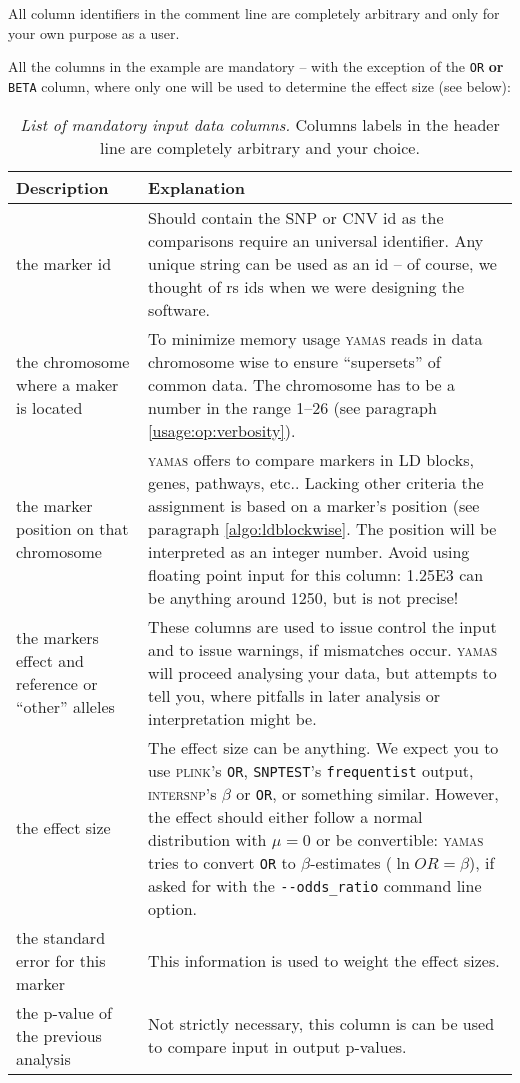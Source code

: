 All column identifiers in the comment line are completely arbitrary and only for your own purpose as a user.

All the columns in the example are mandatory -- with the exception of the \verb+OR+ \textbf{or} \verb+BETA+ column, where only one will be used to determine the effect size (see below):

\begin{table}[H]
 \caption{\emph{List of mandatory input data columns.} Columns labels in the header line are completely arbitrary and your choice.}
 \centering
\begin{tabular}{p{6cm}p{8cm}}
\rowcolor{light-gray}Description & Explanation\\\hline
the marker id  & Should contain the SNP or CNV id as the comparisons require an universal identifier. Any unique string can be used as an id -- of course, we thought of rs ids when we were designing the software.\\
the chromosome where a maker is located & To minimize memory usage \textsc{yamas} reads in data chromosome wise to ensure ``supersets'' of common data. The chromosome has to be a number in the range 1--26 (see paragraph \ref{usage:op:verbosity}).\\
the marker position on that chromosome & \textsc{yamas} offers to compare markers in LD blocks, genes, pathways, etc.. Lacking other criteria the assignment is based on a marker's position (see paragraph \ref{algo:ldblockwise}.
The position will be interpreted as an integer number. Avoid using floating point input for this column: 1.25E3 can be anything around 1250, but is not precise!\\
the markers effect and reference or ``other'' alleles & These columns are used to issue control the input and to issue warnings, if mismatches occur. \textsc{yamas} will proceed analysing your data, but attempts to tell you, where pitfalls in later analysis or interpretation might be.\\
the effect size & The effect size can be anything. We expect you to use \textsc{plink}'s \verb+OR+, \texttt{SNPTEST}'s \verb+frequentist+ output, \textsc{intersnp}'s $\beta$ or \verb+OR+, or something similar. However, the effect should either follow a normal distribution with $\mu = 0$ or be convertible: \textsc{yamas} tries to convert \verb+OR+ to $\beta$-estimates ($\ln{OR} = \beta$), if asked for with the \verb+--odds_ratio+ command line option.\\
the standard error for this marker & This information is used to weight the effect sizes.\\
the p-value of the previous analysis & Not strictly necessary, this column is can be used to compare input in output p-values.
\end{tabular}
\end{table}

